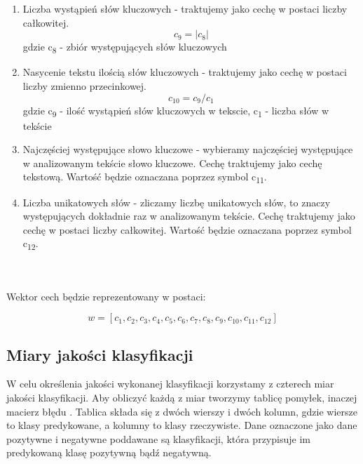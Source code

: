 \documentclass{classrep}
\begin{document}
\begin{enumerate}
  \item Liczba wystąpień słów kluczowych - traktujemy jako cechę w postaci liczby całkowitej.\begin{equation}  c_9 = | c_8 | \end{equation} gdzie c\textsubscript{8} - zbiór występujących słów kluczowych\\
  \item Nasycenie tekstu ilością słów kluczowych - traktujemy jako cechę w postaci liczby zmienno przecinkowej.  \begin{equation} c_{10} = c_9 / c_1 \end{equation}  gdzie c\textsubscript{9} - ilość wystąpień słów kluczowych w tekscie, c\textsubscript{1} - liczba słów w tekście\\
  \item Najczęściej występujące słowo kluczowe - wybieramy najczęściej występujące w analizowanym tekście słowo kluczowe. Cechę traktujemy jako cechę tekstową. Wartość będzie oznaczana poprzez symbol  c\textsubscript{11}.\\
  \item Liczba unikatowych słów - zliczamy liczbę unikatowych słów, to znaczy występujących dokładnie raz w analizowanym tekście. Cechę traktujemy jako cechę w postaci liczby całkowitej. Wartość będzie oznaczana poprzez symbol  c\textsubscript{12}.\\
\end{enumerate}

\ \\ \\
Wektor cech będzie reprezentowany w postaci: 

\begin{equation} w = [c_1, c_2, c_3, c_4, c_5, c_6, c_7, c_8, c_9, c_{10}, c_{11}, c_{12}] \end{equation}



\subsection{Miary jakości klasyfikacji} 
W celu określenia jakości wykonanej klasyfikacji korzystamy z czterech miar jakości klasyfikacji. Aby obliczyć każdą z miar tworzymy tablicę pomyłek, inaczej macierz błędu \cite{tablica}. Tablica składa się z dwóch wierszy i dwóch kolumn, gdzie wiersze to klasy predykowane, a kolumny to klasy rzeczywiste. Dane oznaczone jako dane pozytywne i negatywne poddawane są klasyfikacji, która przypisuje im predykowaną klasę pozytywną bądź negatywną.\\
\end{document}
